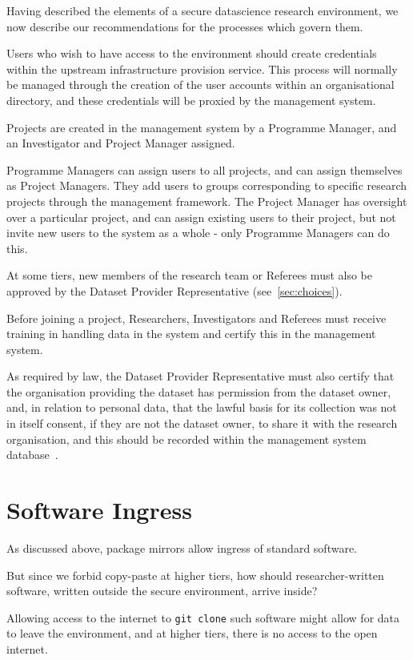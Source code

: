 \documentclass[10pt,a4paper,twocolumn]{article}
\begin{document}
Having described the elements of a secure datascience research environment, we now describe our recommendations for the processes which govern them.

Users who wish to have access to the environment should create credentials within the upstream infrastructure
provision service. This process will normally be managed through the creation of the user accounts within an
organisational directory, and these credentials will be proxied by the management system.

Projects are created in the management system by a Programme Manager, and an Investigator and Project Manager assigned.

Programme Managers can assign users to all projects, and can assign themselves as Project Managers. They add users to groups corresponding to specific research projects through the management framework. The Project Manager has oversight over a particular project, and can assign existing users to their project, but not invite new users to the system as a whole - only Programme Managers can do this. 

At some tiers, new members of the research team or Referees must also be approved by the Dataset Provider Representative (see~\ref{sec:choices}).

Before joining a project, Researchers, Investigators and Referees must receive training in handling data in the system and certify this in the management system.

As required by law, the Dataset Provider Representative must also certify that the organisation providing the dataset has permission from the dataset owner, and, in relation to personal data, that the lawful basis for its collection was not in itself consent,
if they are not the dataset owner, to share it with the research organisation, and this should be recorded within the management system database~\cite{GDPR}.

\section{Software Ingress}

As discussed above, package mirrors allow ingress of standard software.

But since we forbid copy-paste at higher tiers, how should researcher-written software, written outside the secure
environment, arrive inside?

Allowing access to the internet to \verb|git clone| such software  might allow for data to leave the environment, and at higher tiers, there is no access to the open internet. 
\end{document}
